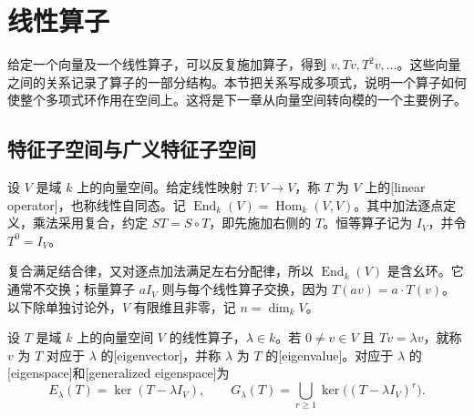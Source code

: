 
\section{线性算子}
\label{b2:sec:0103}

给定一个向量及一个线性算子，可以反复施加算子，得到 \(v,Tv,T^2v,\ldots\)。这些向量之间的关系记录了算子的一部分结构。本节把关系写成多项式，说明一个算子如何使整个多项式环作用在空间上。这将是下一章从向量空间转向模的一个主要例子。

%
%

\subsection{特征子空间与广义特征子空间}
\label{b2:subsec:0103:01}

\begin{definition}\label{b2:def:linear-operator}
	设 \(V\) 是域 \(k\) 上的向量空间。给定线性映射 \(T:V\to V\)，称 \(T\) 为 \(V\) 上的[linear operator]，也称线性自同态。记 \(\operatorname{End}_k(V)=\operatorname{Hom}_k(V,V)\)。其中加法逐点定义，乘法采用复合，约定 \(ST=S\circ T\)，即先施加右侧的 \(T\)。恒等算子记为 \(I_V\)，并令 \(T^0=I_V\)。
\end{definition}


复合满足结合律，又对逐点加法满足左右分配律，所以 \(\operatorname{End}_k(V)\) 是含幺环。它通常不交换；标量算子 \(aI_V\) 则与每个线性算子交换，因为 \(T(av)=a\cdot T(v)\)。以下除单独讨论外，\(V\) 有限维且非零，记 \(n=\dim_kV\)。

\begin{definition}\label{b2:def:eigen-generalized}
	设 \(T\) 是域 \(k\) 上的向量空间 \(V\) 的线性算子，\(\lambda\in k\)。若 \(0\ne v\in V\) 且 \(Tv=\lambda v\)，就称 \(v\) 为 \(T\) 对应于 \(\lambda\) 的[eigenvector]，并称 \(\lambda\) 为 \(T\) 的[eigenvalue]。对应于 \(\lambda\) 的[eigenspace]和[generalized eigenspace]为
	\[
		E_\lambda(T)=\ker(T-\lambda I_V),\qquad G_\lambda(T)=\bigcup_{r\ge1}\ker\bigl((T-\lambda I_V)^r\bigr).
	\]
\end{definition}

